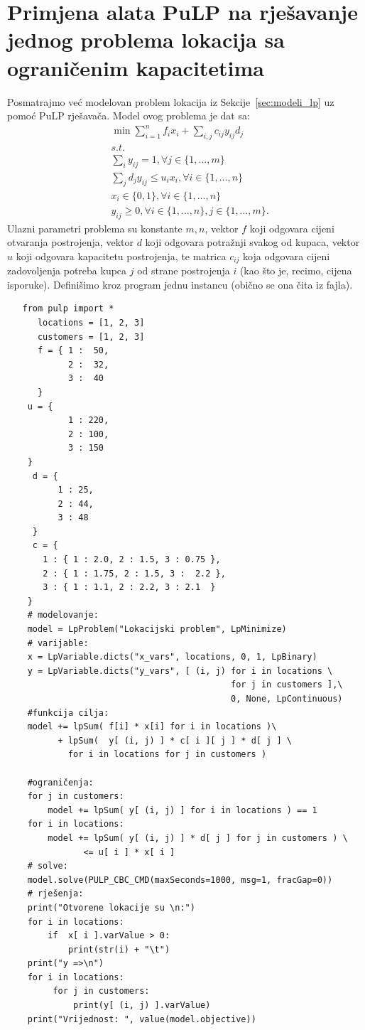 \documentclass[a4paper, utf8, 11pt, colorlinks]{book}
\theoremstyle{definition}
\begin{document}
 \section{Primjena alata PuLP na rješavanje jednog problema lokacija sa ograničenim kapacitetima}%
 Posmatrajmo već modelovan problem lokacija iz Sekcije~\ref{sec:modeli_lp} uz pomoć PuLP rješavača. Model ovog problema je dat sa:
 \begin{align*}
 	   & \min \sum_{i=1}^n f_i x_i  + \sum_{i,j} c_{ij} y_{ij} d_j  \\
 	   &s.t. \nonumber \\
 	   & \sum_{i} y_{ij} = 1, \forall j\in\{1,\ldots,m\} \\
 	   & \sum_{j} d_j y_{ij} \leq u_i x_i, \forall i \in \{1,\ldots,n\} \\
 	   & x_i \in \{0, 1\}, \forall i \in \{1, \ldots, n\} \\
 	   & y_{ij} \geq 0, \forall i \in \{1,\ldots,n \}, j \in \{1, \ldots, m\}.
 \end{align*}
 Ulazni parametri problema su konstante $m, n$, vektor $f$ koji odgovara cijeni otvaranja postrojenja, vektor $d$ koji odgovara potražnji svakog od kupaca, vektor $u$ koji odgovara kapacitetu postrojenja, te matrica $c_{ij}$ koja 
 odgovara cijeni zadovoljenja potreba kupca $j$ od strane postrojenja $i$ (kao što je, recimo, cijena isporuke).  Definišimo kroz program jednu instancu (obično se ona čita iz fajla). 
 \begin{verbatim}
   from pulp import *
 	  locations = [1, 2, 3]
 	  customers = [1, 2, 3]
 	  f = { 1 :  50,
 	        2 :  32,
 	        3 :  40 
 	  }
    u = {
            1 : 220,
            2 : 100,
            3 : 150
    }
     d = {
          1 : 25,
          2 : 44,
          3 : 48
     }
     c = {
       1 : { 1 : 2.0, 2 : 1.5, 3 : 0.75 },
       2 : { 1 : 1.75, 2 : 1.5, 3 :  2.2 },  
       3 : { 1 : 1.1, 2 : 2.2, 3 : 2.1  }
    }
    # modelovanje:
    model = LpProblem("Lokacijski problem", LpMinimize) 
    # varijable:
    x = LpVariable.dicts("x_vars", locations, 0, 1, LpBinary)
    y = LpVariable.dicts("y_vars", [ (i, j) for i in locations \ 
                                            for j in customers ],\  
                                            0, None, LpContinuous)
    #funkcija cilja: 
    model += lpSum( f[i] * x[i] for i in locations )\ 
          + lpSum(  y[ (i, j) ] * c[ i ][ j ] * d[ j ] \ 
            for i in locations for j in customers )
   
    #ograničenja:
    for j in customers:
        model += lpSum( y[ (i, j) ] for i in locations ) == 1
    for i in locations: 
        model += lpSum( y[ (i, j) ] * d[ j ] for j in customers ) \ 
               <= u[ i ] * x[ i ]
    # solve:
    model.solve(PULP_CBC_CMD(maxSeconds=1000, msg=1, fracGap=0))
    # rješenja:
    print("Otvorene lokacije su \n:")
    for i in locations:
        if  x[ i ].varValue > 0:
            print(str(i) + "\t")
    print("y =>\n")
    for i in locations:
         for j in customers:
             print(y[ (i, j) ].varValue)
    print("Vrijednost: ", value(model.objective))    
 \end{verbatim}
\end{document}
